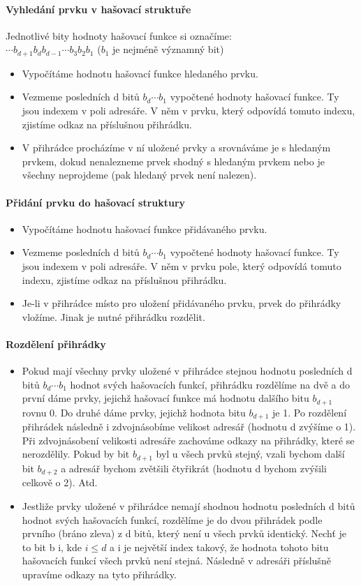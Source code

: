 \documentclass[10pt,a4paper]{article}
\begin{document}
\paragraph{Vyhledání prvku v hašovací struktuře}
Jednotlivé bity hodnoty hašovací funkce si označíme: \\
$\cdots b_{d+1} b_d b_{d-1} \cdots b_3 b_2 b_1$ ($b_1$ je nejméně významný bit)
\begin{itemize}
	\item Vypočítáme hodnotu hašovací funkce hledaného prvku.
	\item Vezmeme posledních d bitů $b_d\cdots b_1$ vypočtené hodnoty hašovací funkce. Ty jsou indexem v poli adresáře. V něm v prvku, který odpovídá tomuto indexu, zjistíme odkaz na příslušnou přihrádku.
	\item V přihrádce procházíme v ní uložené prvky a srovnáváme je s hledaným prvkem, dokud nenalezneme prvek shodný s hledaným prvkem nebo je všechny neprojdeme (pak hledaný prvek není nalezen).
\end{itemize}
\paragraph{Přidání prvku do hašovací struktury}
\begin{itemize}
	\item Vypočítáme hodnotu hašovací funkce přidávaného prvku.
	\item Vezmeme posledních d bitů $b_d \cdots b_1$ vypočtené hodnoty hašovací funkce. Ty jsou indexem v poli adresáře. V něm v prvku pole, který odpovídá tomuto indexu, zjistíme odkaz na příslušnou přihrádku.
	\item Je-li v přihrádce místo pro uložení přidávaného prvku, prvek do přihrádky vložíme. Jinak je nutné přihrádku rozdělit.
\end{itemize}
\paragraph{Rozdělení přihrádky}
\begin{itemize}
	\item Pokud mají všechny prvky uložené v přihrádce stejnou hodnotu posledních d bitů $b_d \cdots b_1$ hodnot svých hašovacích funkcí, přihrádku rozdělíme na dvě a do první dáme prvky, jejichž hašovací funkce má hodnotu dalšího bitu $b_{d+1}$ rovnu 0. Do druhé dáme prvky, jejichž hodnota bitu $b_{d+1}$ je 1. Po rozdělení přihrádek následně i zdvojnásobíme velikost adresář (hodnotu d zvýšíme o 1). Při zdvojnásobení velikosti adresáře zachováme odkazy na přihrádky, které se nerozdělily. Pokud by bit $b_{d+1}$ byl u všech prvků stejný, vzali bychom další bit $b_{d+2}$ a adresář bychom zvětšili čtyřikrát (hodnotu d bychom zvýšili celkově o 2). Atd.
	\item Jestliže prvky uložené v přihrádce nemají shodnou hodnotu posledních d bitů hodnot svých hašovacích funkcí, rozdělíme je do dvou přihrádek podle prvního (bráno zleva) z d bitů, který není u všech prvků identický. Nechť je to bit b i, kde $i \leq d$ a i je největší index takový, že hodnota tohoto bitu hašovacích funkcí všech prvků není stejná. Následně v adresáři příslušně upravíme odkazy na tyto přihrádky.
\end{itemize}
\end{document}
